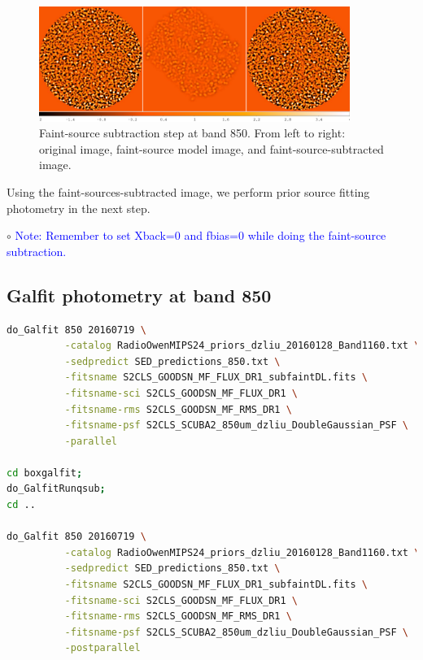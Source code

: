 \documentclass[11pt,a4paper]{article}
\begin{document}
\begin{figure}[H]
	\caption{Faint-source subtraction step at band 850. From left to right: original image, faint-source model image, and faint-source-subtracted image.}
	\includegraphics[width=0.9\textwidth]{galfit_850_FIT_goodsn_850_Map_20160719_Galsub}
\end{figure}

Using the faint-sources-subtracted image, we perform prior source fitting photometry in the next step. 

\indent\hspace{15pt}$\circ$ 
\textcolor{blue}{Note: Remember to set Xback=0 and fbias=0 while doing the faint-source subtraction.}
\\

\subsection{Galfit photometry at band 850}
\label{Band850_Galfit}

\begin{lstlisting}[language=bash]
do_Galfit 850 20160719 \
          -catalog RadioOwenMIPS24_priors_dzliu_20160128_Band1160.txt \
          -sedpredict SED_predictions_850.txt \
          -fitsname S2CLS_GOODSN_MF_FLUX_DR1_subfaintDL.fits \
          -fitsname-sci S2CLS_GOODSN_MF_FLUX_DR1 \
          -fitsname-rms S2CLS_GOODSN_MF_RMS_DR1 \
          -fitsname-psf S2CLS_SCUBA2_850um_dzliu_DoubleGaussian_PSF \
          -parallel

cd boxgalfit;
do_GalfitRunqsub;
cd ..

do_Galfit 850 20160719 \
          -catalog RadioOwenMIPS24_priors_dzliu_20160128_Band1160.txt \
          -sedpredict SED_predictions_850.txt \
          -fitsname S2CLS_GOODSN_MF_FLUX_DR1_subfaintDL.fits \
          -fitsname-sci S2CLS_GOODSN_MF_FLUX_DR1 \
          -fitsname-rms S2CLS_GOODSN_MF_RMS_DR1 \
          -fitsname-psf S2CLS_SCUBA2_850um_dzliu_DoubleGaussian_PSF \
          -postparallel
\end{lstlisting}
\end{document}
